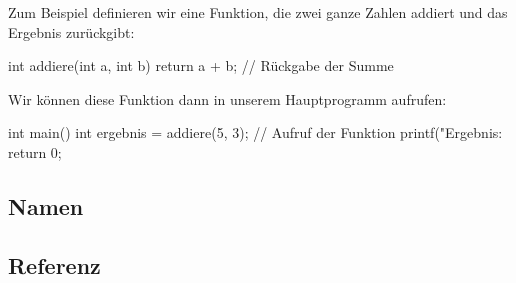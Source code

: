 Zum Beispiel definieren wir eine Funktion, die zwei ganze Zahlen addiert und das Ergebnis zurückgibt:
\begin{code}
int addiere(int a, int b) {
    return a + b; // Rückgabe der Summe
}
\end{code}
Wir können diese Funktion dann in unserem Hauptprogramm aufrufen:
\begin{code}
int main() {
    int ergebnis = addiere(5, 3); // Aufruf der Funktion
    printf("Ergebnis: %
    return 0;
}
\end{code}

\subsection{Namen}
\label{sec:referenz:c:namen}



\newpage
\subsection{Referenz}
\label{sec:referenz:kommandos}

